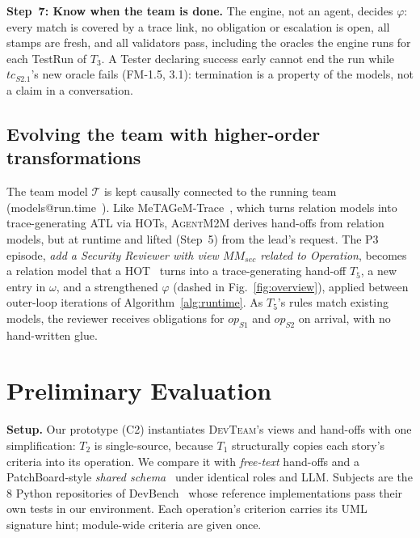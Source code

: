 \documentclass[10pt,conference]{IEEEtran}
\theoremstyle{definition}
\newcommand{\tool}{\textsc{AgentM2M}}
\newcommand{\devteam}{\textsc{DevTeam}}
\newcommand{\MM}{\mathit{MM}}
\newcommand{\team}{\mathcal{T}}
\newcommand{\cls}[1]{\textsf{#1}}
\begin{document}
\smallskip\noindent\textbf{Step~7: Know when the team is done.} The engine,
not an agent, decides $\varphi$: every match is covered by a trace link, no
obligation or escalation is open, all stamps are fresh, and all validators
pass, including the oracles the engine runs for each \cls{TestRun} of
$T_3$. A Tester declaring success early cannot end the run while
$\mathit{tc}_{S2.1}$'s new oracle fails (FM-1.5, 3.1): termination is a
property of the models, not a claim in a conversation.

\subsection{Evolving the team with higher-order transformations}
\label{subsec:hot}

The team model $\team$ is kept causally connected to the running team
(models@run.time~\cite{blair2009runtime}). Like
MeTAGeM-Trace~\cite{vara2014metagem}, which turns relation models into
trace-generating ATL via HOTs, \tool{} derives hand-offs from relation
models, but at runtime and lifted (Step~5) from the lead's request. The P3
episode,
\emph{add a Security Reviewer with view $\MM_{\mathit{sec}}$ related to
\cls{Operation}}, becomes a relation model that a HOT~\cite{tisi2009hot}
turns into a trace-generating hand-off $T_5$, a new entry in $\omega$, and
a strengthened $\varphi$ (dashed in Fig.~\ref{fig:overview}), applied
between outer-loop iterations of Algorithm~\ref{alg:runtime}. As $T_5$'s
rules match existing models, the reviewer receives obligations for
$\mathit{op}_{S1}$ and $\mathit{op}_{S2}$ on arrival, with no hand-written
glue.

\section{Preliminary Evaluation}\label{sec:eval}

\noindent\textbf{Setup.} Our prototype (C2) instantiates \devteam{}'s views
and hand-offs with one simplification: $T_2$ is single-source, because
$T_1$ structurally copies each story's criteria into its operation. We compare it with \emph{free-text} hand-offs
and a PatchBoard-style \emph{shared schema}~\cite{zhang2026patchboard}
under identical roles and LLM. Subjects are the 8 Python repositories of
DevBench~\cite{li2024devbench} whose reference implementations pass their
own tests in our environment. Each operation's criterion carries its UML
signature hint; module-wide criteria are given once.
\end{document}
